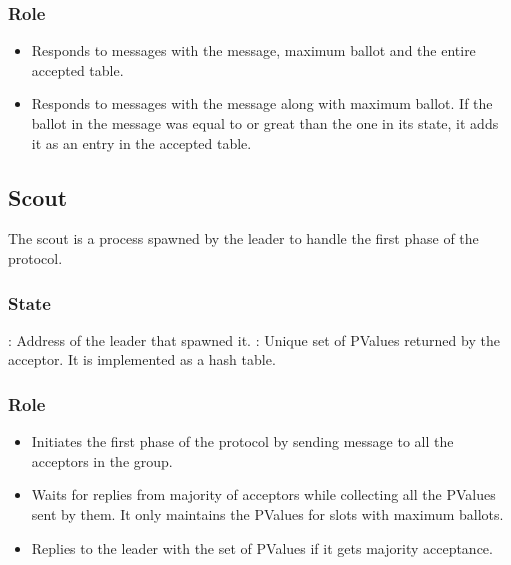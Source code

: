 \subsubsection{Role}

\begin{itemize}
  \item Responds to  messages with the  message,
    maximum ballot and the entire accepted table.
  \item Responds to  messages with the  message
    along with maximum ballot. If the ballot in the  message
    was equal to or great than the one in its state, it adds it as
    an entry in the accepted table.
\end{itemize}

\subsection{Scout}

The scout is a process spawned by the leader to handle the first phase of the
protocol.

\subsubsection{State}
\label{section:scout.state}

\begin{itemize}
    : Address of the leader that spawned it.
    :%
    Unique set of PValues returned by the acceptor. It is implemented as a
    hash table.
\end{itemize}

\subsubsection{Role}

\begin{itemize}
  \item Initiates the first phase of the protocol by sending 
    message to all the acceptors in the group.
  \item Waits for replies from majority of acceptors while collecting
    all the PValues sent by them. It only maintains the PValues for slots
    with maximum ballots.
  \item Replies to the leader with the set of PValues if it gets majority
    acceptance.
\end{itemize}

